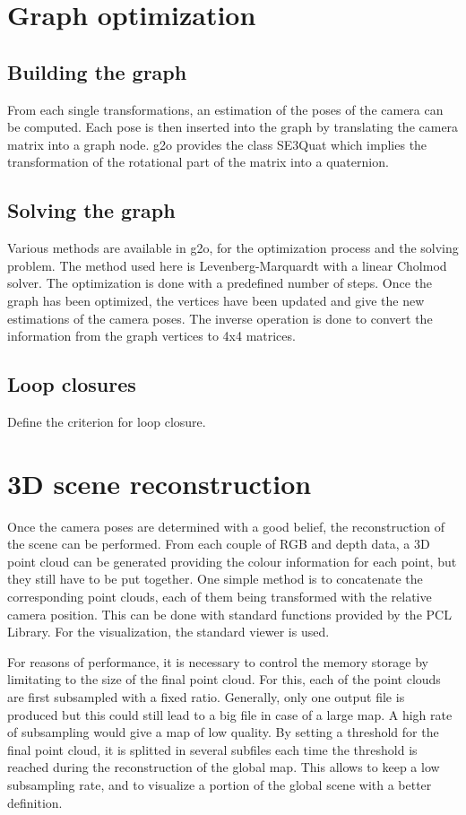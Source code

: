 \documentclass[a4paper,11pt]{kth-mag}
\begin{document}
\section{Graph optimization}
\subsection{Building the graph}

From each single transformations, an estimation of the poses of the camera can be computed. Each pose is then inserted into the graph by translating the camera matrix into a graph node. g2o provides the class SE3Quat which implies the transformation of the rotational part of the matrix into a quaternion.

\subsection{Solving the graph}

Various methods are available in g2o, for the optimization process and the solving problem. The method used here is Levenberg-Marquardt with a linear Cholmod solver. The optimization is done with a predefined number of steps. Once the graph has been optimized, the vertices have been updated and give the new estimations of the camera poses. The inverse operation is done to convert the information from the graph vertices to 4x4 matrices.

\subsection{Loop closures}

Define the criterion for loop closure.

\section{3D scene reconstruction}

Once the camera poses are determined with a good belief, the reconstruction of the scene can be performed. From each couple of RGB and depth data, a 3D point cloud can be generated providing the colour information for each point, but they still have to be put together. One simple method is to concatenate the corresponding point clouds, each of them being transformed with the relative camera position. This can be done with standard functions provided by the PCL Library. For the visualization, the standard viewer is used.

For reasons of performance, it is necessary to control the memory storage by limitating to the size of the final point cloud. For this, each of the point clouds are first subsampled with a fixed ratio. Generally, only one output file is produced but this could still lead to a big file in case of a large map. A high rate of subsampling would give a map of low quality. By setting a threshold for the final point cloud, it is splitted in several subfiles each time the threshold is reached during the reconstruction of the global map. This allows to keep a low subsampling rate, and to visualize a portion of the global scene with a better definition.
\end{document}
